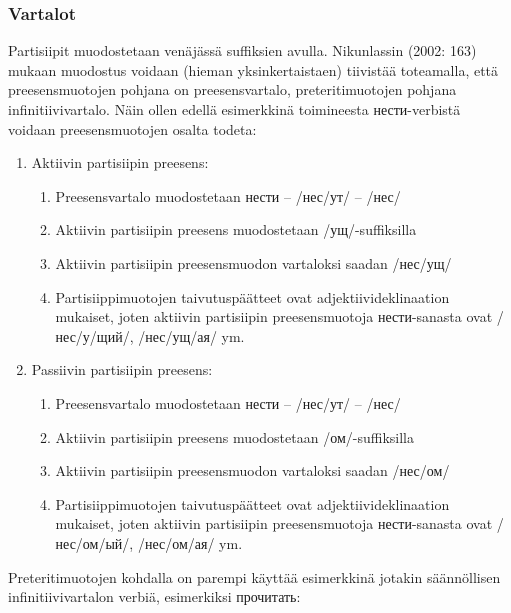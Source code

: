 \documentclass[]{scrreprt}
\providecommand{\tightlist}{%
  \setlength{\itemsep}{0pt}\setlength{\parskip}{0pt}}
\begin{document}
\subsubsection{Vartalot}\label{vartalot}

Partisiipit muodostetaan venäjässä suffiksien avulla. Nikunlassin (2002:
163) mukaan muodostus voidaan (hieman yksinkertaistaen) tiivistää
toteamalla, että preesensmuotojen pohjana on preesensvartalo,
preteritimuotojen pohjana infinitiivivartalo. Näin ollen edellä
esimerkkinä toimineesta нести-verbistä voidaan preesensmuotojen osalta
todeta:

\begin{enumerate}
\def\labelenumi{\alph{enumi})}
\tightlist
\item
  Aktiivin partisiipin preesens:

  \begin{enumerate}
  \def\labelenumii{\arabic{enumii}.}
  \tightlist
  \item
    Preesensvartalo muodostetaan нести -- /нес/ут/ -- /нес/
  \item
    Aktiivin partisiipin preesens muodostetaan /ущ/-suffiksilla
  \item
    Aktiivin partisiipin preesensmuodon vartaloksi saadan /нес/ущ/
  \item
    Partisiippimuotojen taivutuspäätteet ovat adjektiivideklinaation
    mukaiset, joten aktiivin partisiipin preesensmuotoja нести-sanasta
    ovat /нес/у/щий/, /нес/ущ/ая/ ym.
  \end{enumerate}
\item
  Passiivin partisiipin preesens:

  \begin{enumerate}
  \def\labelenumii{\arabic{enumii}.}
  \tightlist
  \item
    Preesensvartalo muodostetaan нести -- /нес/ут/ -- /нес/
  \item
    Aktiivin partisiipin preesens muodostetaan /ом/-suffiksilla
  \item
    Aktiivin partisiipin preesensmuodon vartaloksi saadan /нес/ом/
  \item
    Partisiippimuotojen taivutuspäätteet ovat adjektiivideklinaation
    mukaiset, joten aktiivin partisiipin preesensmuotoja нести-sanasta
    ovat /нес/ом/ый/, /нес/ом/ая/ ym.
  \end{enumerate}
\end{enumerate}

Preteritimuotojen kohdalla on parempi käyttää esimerkkinä jotakin
säännöllisen infinitiivivartalon verbiä, esimerkiksi прочитать:
\end{document}
